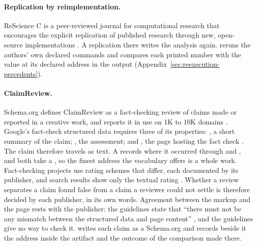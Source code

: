 \paragraph{Replication by reimplementation.} ReScience C is a peer-reviewed journal for computational
research that encourages the explicit replication of published research through new, open-source
implementations \citep{rougier2017rescience}. A replication there writes the analysis again.
 reruns the authors' own declared commands and compares each printed number
with the value at its declared address in the output (Appendix~\ref{sec:reexecution-precedents}).

\paragraph{ClaimReview.} Schema.org defines ClaimReview as a fact-checking review of claims made or
reported in a creative work, and reports it in use on 1K to 10K domains
\citep{schemaorg2026claimreview}. Google's fact-check structured data requires three of its
properties: , a short summary of the claim; , the
assessment; and , the page hosting the fact check \citep{google2026factcheck}. The claim
therefore travels as text. A  records where it occurred through  and
, and both take a  \citep{schemaorg2026claimreview}, so the
finest address the vocabulary offers is a whole work. Fact-checking projects use rating schemes that
differ, each documented by its publisher, and search results show only the textual rating
\citep{google2026factcheck}. Whether a review separates a claim found false from a claim a reviewer
could not settle is therefore decided by each publisher, in its own words. Agreement between the
markup and the page rests with the publisher: the guidelines state that ``there must not be any
mismatch between the structured data and page content'' \citep{google2026factcheck}, and the
guidelines give no way to check it.  writes each claim as a Schema.org
 and records beside it the address inside the artifact and the outcome of the
comparison made there.

